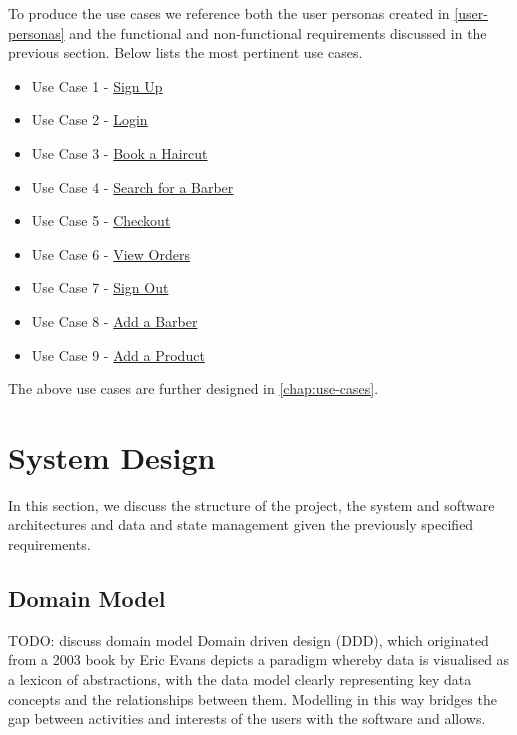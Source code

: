 \documentclass[12pt]{article}
\begin{document}
	To produce the use cases we reference both the user personas created in \autoref{user-personas} and the functional and non-functional requirements discussed in the previous section. Below lists the most pertinent use cases.

	\begin{itemize}
		\item Use Case 1 - \textcolor{blue}{\hyperref[chap:use-cases-1]{Sign Up}}
		\item Use Case 2 - \textcolor{blue}{\hyperref[chap:use-cases-2]{Login}}
		\item Use Case 3 - \textcolor{blue}{\hyperref[chap:use-cases-3]{Book a Haircut}}
		\item Use Case 4 - \textcolor{blue}{\hyperref[chap:use-cases-4]{Search for a Barber}}
		\item Use Case 5 - \textcolor{blue}{\hyperref[chap:use-cases-5]{Checkout}}
		\item Use Case 6 - \textcolor{blue}{\hyperref[chap:use-cases-6]{View Orders}}
		\item Use Case 7 - \textcolor{blue}{\hyperref[chap:use-cases-7]{Sign Out}}
		\item Use Case 8 - \textcolor{blue}{\hyperref[chap:use-cases-8]{Add a Barber}}
		\item Use Case 9 - \textcolor{blue}{\hyperref[chap:use-cases-9]{Add a Product}}
	\end{itemize}
	
	The above use cases are further designed in \autoref{chap:use-cases}.

	
	\section{System Design}
	In this section, we discuss the structure of the project, the system and software architectures and data and state management given the previously specified requirements. 
	
	\subsection{Domain Model}
	TODO: discuss domain model
	Domain driven design (DDD), which originated from a 2003 book by Eric Evans \cite{evansDomainDrivenDesignTackling2003} depicts a paradigm whereby data is visualised as a lexicon of abstractions, with the data model clearly representing key data concepts and the relationships between them. Modelling in this way bridges the gap between activities and interests of the users with the software and allows.
	
\end{document}
